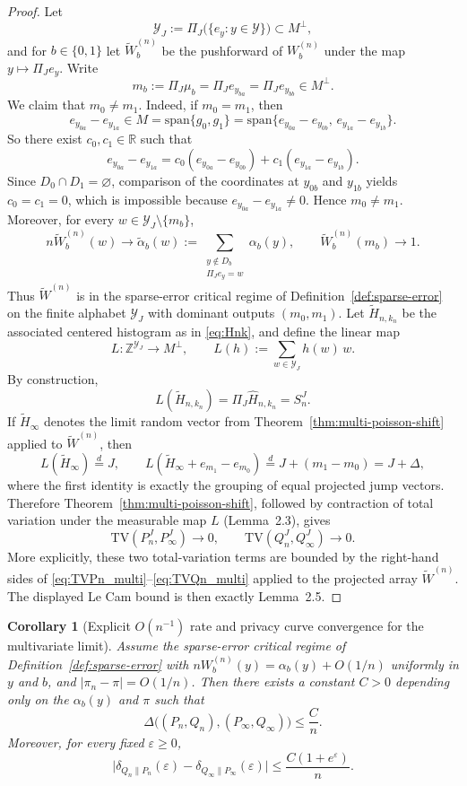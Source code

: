 \documentclass{article}
\newtheorem{corollary}[theorem]{Corollary}
\begin{document}
\begin{proof}
Let
\[
\mathcal Y_J:=\Pi_J\bigl(\{e_y:y\in\mathcal Y\}\bigr)\subset M^\perp,
\]
and for $b\in\{0,1\}$ let $\widetilde W_b^{(n)}$ be the pushforward of $W_b^{(n)}$ under the map
$y\mapsto \Pi_J e_y$. Write
\[
m_b:=\Pi_J\mu_b=\Pi_J e_{y_{ba}}=\Pi_J e_{y_{bb}}\in M^\perp.
\]
We claim that $m_0\neq m_1$. Indeed, if $m_0=m_1$, then
\[
e_{y_{0a}}-e_{y_{1a}}\in M=\mathrm{span}\{g_0,g_1\}
=\mathrm{span}\{e_{y_{0a}}-e_{y_{0b}},\,e_{y_{1a}}-e_{y_{1b}}\}.
\]
So there exist $c_0,c_1\in\mathbb R$ such that
\[
e_{y_{0a}}-e_{y_{1a}}
=c_0(e_{y_{0a}}-e_{y_{0b}})+c_1(e_{y_{1a}}-e_{y_{1b}}).
\]
Since $D_0\cap D_1=\varnothing$, comparison of the coordinates at $y_{0b}$ and $y_{1b}$ yields
$c_0=c_1=0$, which is impossible because $e_{y_{0a}}-e_{y_{1a}}\neq 0$. Hence $m_0\neq m_1$.
Moreover, for every $w\in\mathcal Y_J\setminus\{m_b\}$,
\[
n\widetilde W_b^{(n)}(w)\to \widetilde\alpha_b(w):=
\sum_{\substack{y\notin D_b\\ \Pi_J e_y=w}} \alpha_b(y),
\qquad
\widetilde W_b^{(n)}(m_b)\to 1.
\]
Thus $\widetilde W^{(n)}$ is in the sparse-error critical regime of Definition~\ref{def:sparse-error}
on the finite alphabet $\mathcal Y_J$ with dominant outputs $(m_0,m_1)$. Let $\widetilde H_{n,k_n}$
be the associated centered histogram as in \eqref{eq:Hnk}, and define the linear map
\[
L:\mathbb Z^{\mathcal Y_J}\to M^\perp,
\qquad
L(h):=\sum_{w\in\mathcal Y_J} h(w)\,w.
\]
By construction,
\[
L(\widetilde H_{n,k_n})=\Pi_J\widehat H_{n,k_n}=S_n^J.
\]
If $\widetilde H_\infty$ denotes the limit random vector from
Theorem~\ref{thm:multi-poisson-shift} applied to $\widetilde W^{(n)}$, then
\[
L(\widetilde H_\infty)\overset{d}=J,
\qquad
L(\widetilde H_\infty+e_{m_1}-e_{m_0})\overset{d}=J+(m_1-m_0)=J+\Delta,
\]
where the first identity is exactly the grouping of equal projected jump vectors. Therefore
Theorem~\ref{thm:multi-poisson-shift}, followed by contraction of total variation under the
measurable map $L$ (Lemma~2.3), gives
\[
\mathrm{TV}(P_n^J,P_\infty^J)\to 0,
\qquad
\mathrm{TV}(Q_n^J,Q_\infty^J)\to 0.
\]
More explicitly, these two total-variation terms are bounded by the right-hand sides of
\eqref{eq:TVPn_multi}--\eqref{eq:TVQn_multi} applied to the projected array $\widetilde W^{(n)}$.
The displayed Le Cam bound is then exactly Lemma~2.5.
\end{proof}


\begin{corollary}[Explicit $O(n^{-1})$ rate and privacy curve convergence for the multivariate limit]
\label{cor:multi-explicit-rate}
Assume the sparse-error critical regime of Definition~\ref{def:sparse-error} with $n W^{(n)}_b(y) = \alpha_b(y) + O(1/n)$
uniformly in $y$ and $b$, and $|\pi_n - \pi| = O(1/n)$. Then there exists a constant $C > 0$ depending
only on the $\alpha_b(y)$ and $\pi$ such that
\[
\Delta\bigl((P_n,Q_n),(P_\infty,Q_\infty)\bigr) \leq \frac{C}{n}.
\]
Moreover, for every fixed $\varepsilon \geq 0$,
\[
\bigl|\delta_{Q_n\|P_n}(\varepsilon) - \delta_{Q_\infty\|P_\infty}(\varepsilon)\bigr| \leq \frac{C(1+e^\varepsilon)}{n}.
\]
\end{corollary}
\end{document}
